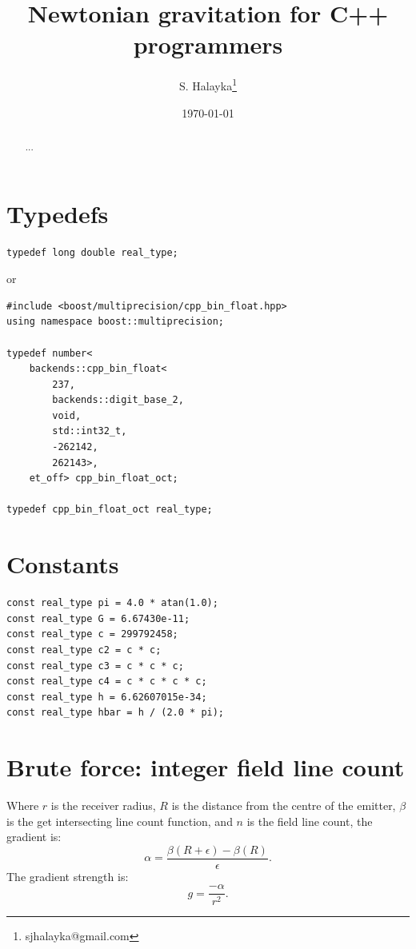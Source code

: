 \documentclass[12pt]{article}
\title{Newtonian gravitation for C++ programmers}
\author{S. Halayka\footnote{sjhalayka@gmail.com}}
\date{\today\;\currenttime}
\begin{document}
 
\maketitle

\begin{abstract}
...
\end{abstract}



\section{Typedefs}

\begin{lstlisting}
typedef long double real_type;
\end{lstlisting}

or

\begin{lstlisting}
#include <boost/multiprecision/cpp_bin_float.hpp>
using namespace boost::multiprecision;

typedef number<
	backends::cpp_bin_float<
		237, 
		backends::digit_base_2, 
		void, 
		std::int32_t, 
		-262142, 
		262143>, 
	et_off> cpp_bin_float_oct;

typedef cpp_bin_float_oct real_type;
\end{lstlisting}





\section{Constants}

\begin{lstlisting}
const real_type pi = 4.0 * atan(1.0);
const real_type G = 6.67430e-11;
const real_type c = 299792458;
const real_type c2 = c * c;
const real_type c3 = c * c * c;
const real_type c4 = c * c * c * c;
const real_type h = 6.62607015e-34;
const real_type hbar = h / (2.0 * pi);
\end{lstlisting}






\section{Brute force: integer field line count}

Where $r$ is the receiver radius, $R$ is the distance from the centre of the emitter, $\beta$ is the get intersecting line count function, and $n$ is the field line count, the gradient is:
\begin{equation}
\alpha = \frac{\beta(R + \epsilon) - \beta(R)}{\epsilon}.
\end{equation}
The gradient strength is:
\begin{equation}
g = \frac{-\alpha}{r^2}.
\end{equation}
\end{document}
